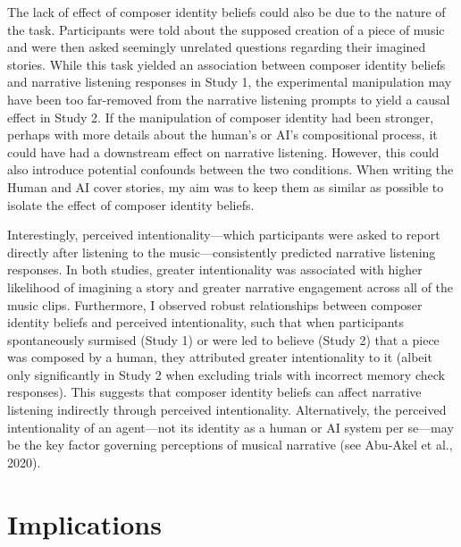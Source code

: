 \documentclass[12pt,twoside]{reedthesis}
\begin{document}
The lack of effect of composer identity beliefs could also be due to the nature of the task. Participants were told about the supposed creation of a piece of music and were then asked seemingly unrelated questions regarding their imagined stories. While this task yielded an association between composer identity beliefs and narrative listening responses in Study 1, the experimental manipulation may have been too far-removed from the narrative listening prompts to yield a causal effect in Study 2. If the manipulation of composer identity had been stronger, perhaps with more details about the human’s or AI’s compositional process, it could have had a downstream effect on narrative listening. However, this could also introduce potential confounds between the two conditions. When writing the Human and AI cover stories, my aim was to keep them as similar as possible to isolate the effect of composer identity beliefs.

Interestingly, perceived intentionality—which participants were asked to report directly after listening to the music—consistently predicted narrative listening responses. In both studies, greater intentionality was associated with higher likelihood of imagining a story and greater narrative engagement across all of the music clips. Furthermore, I observed robust relationships between composer identity beliefs and perceived intentionality, such that when participants spontaneously surmised (Study 1) or were led to believe (Study 2) that a piece was composed by a human, they attributed greater intentionality to it (albeit only significantly in Study 2 when excluding trials with incorrect memory check responses). This suggests that composer identity beliefs can affect narrative listening indirectly through perceived intentionality. Alternatively, the perceived intentionality of an agent—not its identity as a human or AI system per se—may be the key factor governing perceptions of musical narrative (see Abu-Akel et al., 2020). 
 

\section*{Implications}
\end{document}
